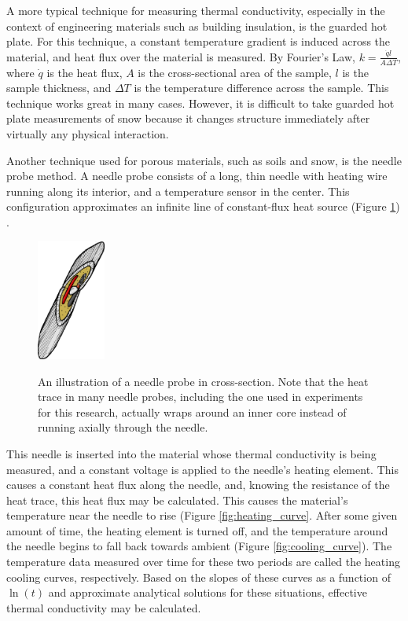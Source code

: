 A more typical technique for measuring thermal conductivity, especially in the
context of engineering materials such as building insulation, is the guarded
hot plate. For this technique, a constant temperature gradient is induced across
the material, and heat flux over the material is measured.  By Fourier's Law,
\(k = \frac{\dot{q}l}{A\Delta T}\), where \(\dot{q}\) is the heat flux, \(A\) is
the cross-sectional area of the sample, \(l\) is the sample thickness, and 
\(\Delta T\) is the temperature difference across the sample. This technique
works great in many cases. However, it is difficult to take guarded hot plate
measurements of snow because it changes structure immediately after virtually
any physical interaction.

Another technique used for porous materials, such as soils and snow, is the
needle probe method. A needle probe consists of a long, thin needle with heating
wire running along its interior, and a temperature sensor in the center. This
configuration approximates an infinite line of constant-flux heat source
(Figure \ref{fig:needle_xsect}) \cite{basictheory}.

\begin{figure}[h]
\centering
\includegraphics[width=0.2\textwidth]{fig/needle_xsect.png}
\label{fig:needle_xsect}
\caption{An illustration of a needle probe in cross-section. Note that the heat
trace in many needle probes, including the one used in experiments for this
research, actually wraps around an inner core instead of running axially through
the needle.}
\end{figure}

This needle is inserted into the material whose thermal conductivity is being
measured, and a constant voltage is applied to the needle's heating element.
This causes a constant heat flux along the needle, and, knowing the resistance
of the heat trace, this heat flux may be calculated. This causes the material's
temperature near the needle to rise (Figure \ref{fig:heating_curve}. After some
given amount of time, the heating element is turned off, and the temperature
around the needle begins to fall back towards ambient (Figure \ref{fig:cooling_curve}).
The temperature data measured over time for these two periods are called the
heating cooling curves, respectively.  Based on the slopes of these
curves as a function of \(\ln(t)\) and approximate analytical solutions for
these situations, effective thermal conductivity may be calculated.

